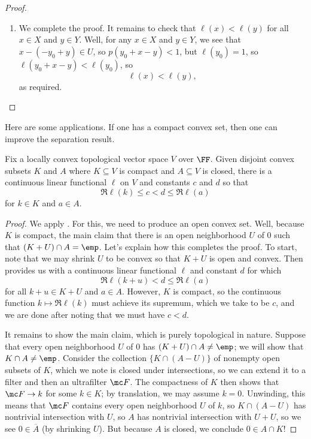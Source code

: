 \documentclass[notes.tex]{subfiles}
\begin{document}
\begin{proof}
\begin{enumerate}
		\item We complete the proof. It remains to check that $\ell(x)<\ell(y)$ for all $x\in X$ and $y\in Y$. Well, for any $x\in X$ and $y\in Y$, we see that $x-(-y_0+y)\in U$, so $p(y_0+x-y)<1$, but $\ell(y_0)=1$, so $\ell(y_0+x-y)<\ell(y_0)$, so
		\[\ell(x)<\ell(y),\]
		as required.
		\qedhere
	\end{enumerate}
\end{proof}
Here are some applications. If one has a compact convex set, then one can improve the separation result.
\begin{corollary} \label{cor:separate-compact}
	Fix a locally convex topological vector space $V$ over $\FF$. Given disjoint convex subsets $K$ and $A$ where $K\subseteq V$ is compact and $A\subseteq V$ is closed, there is a continuous linear functional $\ell$ on $V$ and constants $c$ and $d$ so that
	\[\Re\ell(k)\le c<d\le\Re\ell(a)\]
	for $k\in K$ and $a\in A$.
\end{corollary}
\begin{proof}
	We apply . For this, we need to produce an open convex set. Well, because $K$ is compact, the main claim that there is an open neighborhood $U$ of $0$ such that $(K+U)\cap A=\emp$. Let's explain how this completes the proof. To start, note that we may shrink $U$ to be convex so that $K+U$ is open and convex. Then  provides us with a continuous linear functional $\ell$ and constant $d$ for which
	\[\Re\ell(k+u)<d\le\Re\ell(a)\]
	for all $k+u\in K+U$ and $a\in A$. However, $K$ is compact, so the continuous function $k\mapsto\Re\ell(k)$ must achieve its supremum, which we take to be $c$, and we are done after noting that we must have $c<d$.

	It remains to show the main claim, which is purely topological in nature. Suppose that every open neighborhood $U$ of $0$ has $(K+U)\cap A\ne\emp$; we will show that $K\cap A\ne\emp$. Consider the collection $\{K\cap (A-U)\}$ of nonempty open subsets of $K$, which we note is closed under intersections, so we can extend it to a filter and then an ultrafilter $\mc F$. The compactness of $K$ then shows that $\mc F\to k$ for some $k\in K$; by translation, we may assume $k=0$. Unwinding, this means that $\mc F$ contains every open neighborhood $U$ of $k$, so $K\cap(A-U)$ has nontrivial intersection with $U$, so $A$ has nontrivial intersection with $U+U$, so we see $0\in\overline A$ (by shrinking $U$). But because $A$ is closed, we conclude $0\in A\cap K$!
\end{proof}
\end{document}
